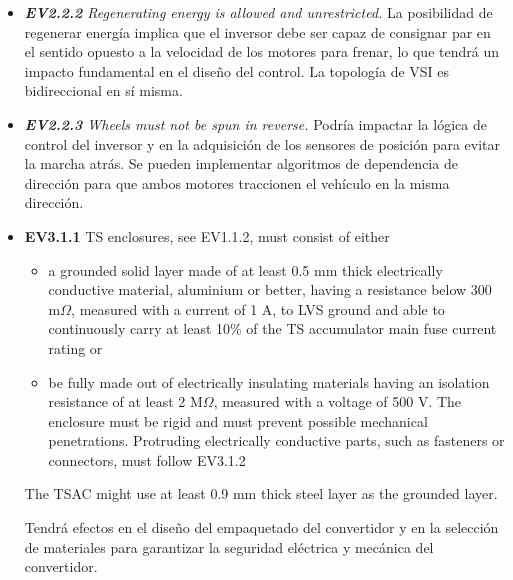 \begin{itemize}

    \item \textit{\textbf{EV2.2.2} Regenerating energy is allowed and unrestricted.} La posibilidad de regenerar energía implica que el inversor debe ser capaz de consignar par en el sentido opuesto a la velocidad de los motores para frenar, lo que tendrá un impacto fundamental en el diseño del control. La topología de VSI es bidireccional en sí misma.
    \item \textit{\textbf{EV2.2.3} Wheels must not be spun in reverse.} Podría impactar la lógica de control del inversor y en la adquisición de los sensores de posición para evitar la marcha atrás. Se pueden implementar algoritmos de dependencia de dirección para que ambos motores traccionen el vehículo en la misma dirección.
    \item \begin{itquote} \textbf{EV3.1.1} TS enclosures, see EV1.1.2, must consist of either
    \begin{itemize}
            \item a grounded solid layer made of at least 0.5 mm thick electrically conductive material, aluminium or better, having a resistance below 300 m$\Omega$, measured with a current of 1 A, to LVS ground and able to continuously carry at least 10\% of the TS accumulator main fuse current rating or 
            \item be fully made out of electrically insulating materials having an isolation resistance of at least 2 M$\Omega$, measured with a voltage of 500 V. The enclosure must be rigid and must prevent possible mechanical penetrations. Protruding electrically conductive parts, such as fasteners or connectors, must follow EV3.1.2
    \end{itemize} The TSAC might use at least 0.9 mm thick steel layer as the grounded layer. \end{itquote} Tendrá efectos en el diseño del empaquetado del convertidor y en la selección de materiales para garantizar la seguridad eléctrica y mecánica del convertidor.


\end{itemize}
